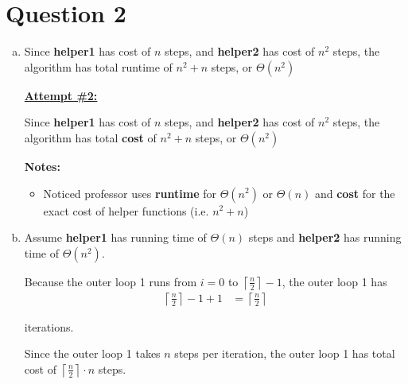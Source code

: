 \documentclass[12pt]{article}
\begin{document}
\section*{Question 2}
\begin{enumerate}[a.]
    \item

    Since \textbf{helper1} has cost of $n$ steps, and \textbf{helper2} has cost of
    $n^2$ steps, the algorithm has total runtime of $n^2 + n$ steps, or $\Theta (n^2)$

    \begin{mdframed}
        \underline{\textbf{Attempt \#2:}}

        \bigskip

        Since \textbf{helper1} has cost of $n$ steps, and \textbf{helper2} has cost of
        $n^2$ steps, the algorithm has total \color{red}\textbf{cost}\color{black}
        \:of $n^2 + n$ steps, or $\Theta (n^2)$

    \end{mdframed}

    \textbf{Notes:}

    \begin{itemize}
     \item Noticed professor uses \textbf{runtime} for $\Theta(n^2)$ or $\Theta(n)$
     and \textbf{cost} for the exact cost of helper functions (i.e. $n^2 + n$)

    \end{itemize}

    \item

    Assume \textbf{helper1} has running time of $\Theta(n)$ steps and \textbf{helper2} has
    running time of $\Theta(n^2)$.

    \bigskip

    Because the outer loop 1 runs from $i = 0$ to $\left\lceil \frac{n}{2} \right\rceil - 1$,
    the outer loop 1 has
    \setcounter{equation}{0}
    \begin{align}
        \left\lceil \frac{n}{2} \right\rceil - 1 + 1 &= \left\lceil \frac{n}{2} \right\rceil
    \end{align}

    iterations.

    \bigskip

    Since the outer loop 1 takes $n$ steps per iteration, the outer loop 1 has
    total cost of $\left\lceil \frac{n}{2} \right\rceil \cdot n$ steps.

    \bigskip


\end{enumerate}
\end{document}
